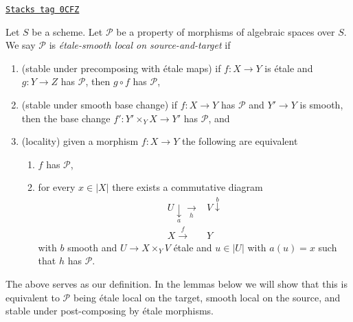 \begin{definition}
\label{spaces-descent-definition-etale-smooth-local-source-target}
\href{https://stacks.math.columbia.edu/tag/0CFZ}{\texttt{Stacks tag 0CFZ}}

Let $S$ be a scheme.
Let $\mathcal{P}$ be a property of morphisms of algebraic spaces over $S$.
We say $\mathcal{P}$ is {\it \'etale-smooth local on source-and-target} if
\begin{enumerate}
\item (stable under precomposing with \'etale maps)
if $f : X \to Y$ is \'etale and $g : Y \to Z$ has $\mathcal{P}$,
then $g \circ f$ has $\mathcal{P}$,
\item (stable under smooth base change)
if $f : X \to Y$ has $\mathcal{P}$ and $Y' \to Y$ is smooth, then
the base change $f' : Y' \times_Y X \to Y'$ has $\mathcal{P}$, and
\item (locality) given a morphism $f : X \to Y$ the following are
equivalent
\begin{enumerate}
\item $f$ has $\mathcal{P}$,
\item for every $x \in |X|$ there exists a commutative diagram
$$
\begin{array}{cc}U \underset{a}{\downarrow}\underset{h}{\longrightarrow} & V \overset{b}{\downarrow} \\ X \overset{f}{\longrightarrow} & Y\end{array}
$$
with $b$ smooth and $U \to X \times_Y V$ \'etale
and $u \in |U|$ with $a(u) = x$ such that
$h$ has $\mathcal{P}$.
\end{enumerate}
\end{enumerate}
\end{definition}

The above serves as our definition. In the lemmas below we will show that
this is equivalent to $\mathcal{P}$ being \'etale local on the target,
smooth local on the source, and stable under post-composing by
\'etale morphisms.


